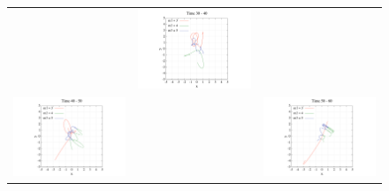 \documentclass[11pt,a4paper,oneside,onecolumn]{jarticle}
\begin{document}
\begin{figure}[H]
\begin{tabular}{ccc}
\begin{minipage}[t]{0.1\hsize}
\end{minipage} &
\begin{minipage}[t]{0.45\hsize}
\centering
\includegraphics[width=8cm]{./image/pythagoras_orbit_30to40.pdf}
\end{minipage}\\
%
\begin{minipage}[t]{0.45\hsize}
\centering
\includegraphics[width=8cm]{./image/pythagoras_orbit_40to50.pdf}
\end{minipage} &
\begin{minipage}[t]{0.1\hsize}
\end{minipage} &
\begin{minipage}[t]{0.45\hsize}
\centering
\includegraphics[width=8cm]{./image/pythagoras_orbit_50to60.pdf}
\end{minipage}\\

\end{tabular}
\end{figure}
\end{document}
